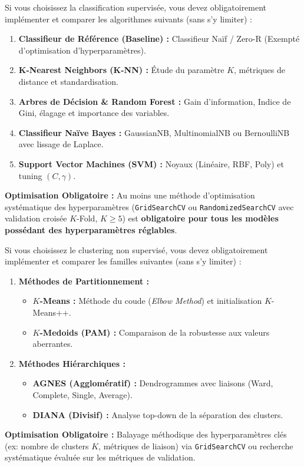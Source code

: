 \documentclass[11pt,a4paper]{article}
\begin{document}
\begin{tcolorbox}[colback=lightgray, colframe=sintefblue, title=\textbf{PARCOURS A : CLASSIFICATION SUPERVISÉE}, arc=2mm]
    Si vous choisissez la classification supervisée, vous devez obligatoirement implémenter et comparer les algorithmes suivants (sans s'y limiter) :
    \begin{enumerate}
        \item \textbf{Classifieur de Référence (Baseline) :} Classifieur Naïf / Zero-R (Exempté d'optimisation d'hyperparamètres).
        \item \textbf{K-Nearest Neighbors (K-NN) :} Étude du paramètre $K$, métriques de distance et standardisation.
        \item \textbf{Arbres de Décision \& Random Forest :} Gain d'information, Indice de Gini, élagage et importance des variables.
        \item \textbf{Classifieur Naïve Bayes :} GaussianNB, MultinomialNB ou BernoulliNB avec lissage de Laplace.
        \item \textbf{Support Vector Machines (SVM) :} Noyaux (Linéaire, RBF, Poly) et tuning $(C, \gamma)$.
    \end{enumerate}
    \textbf{Optimisation Obligatoire :} Au moins une méthode d'optimisation systématique des hyperparamètres (\texttt{GridSearchCV} ou \texttt{RandomizedSearchCV} avec validation croisée $K$-Fold, $K \ge 5$) est \textbf{obligatoire pour tous les modèles possédant des hyperparamètres réglables}.
\end{tcolorbox}

\begin{tcolorbox}[colback=lightgray, colframe=sintefblue, title=\textbf{PARCOURS B : CLUSTERING NON SUPERVISÉ}, arc=2mm]
    Si vous choisissez le clustering non supervisé, vous devez obligatoirement implémenter et comparer les familles suivantes (sans s'y limiter) :
    \begin{enumerate}
        \item \textbf{Méthodes de Partitionnement :}
        \begin{itemize}
            \item \textbf{$K$-Means :} Méthode du coude (\textit{Elbow Method}) et initialisation $K$-Means++.
            \item \textbf{$K$-Medoids (PAM) :} Comparaison de la robustesse aux valeurs aberrantes.
        \end{itemize}
        \item \textbf{Méthodes Hiérarchiques :}
        \begin{itemize}
            \item \textbf{AGNES (Agglomératif) :} Dendrogrammes avec liaisons (Ward, Complete, Single, Average).
            \item \textbf{DIANA (Divisif) :} Analyse top-down de la séparation des clusters.
        \end{itemize}
    \end{enumerate}
    \textbf{Optimisation Obligatoire :} Balayage méthodique des hyperparamètres clés (ex: nombre de clusters $K$, métriques de liaison) via \texttt{GridSearchCV} ou recherche systématique évaluée sur les métriques de validation.
\end{tcolorbox}
\end{document}
